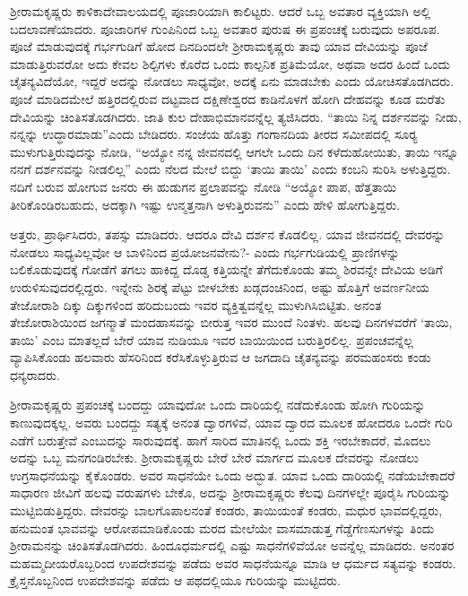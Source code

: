 ಶ‍್ರೀರಾಮಕೃಷ್ಣರು ಕಾಳಿಕಾದೇವಾಲಯದಲ್ಲಿ ಪೂಜಾರಿಯಾಗಿ ಕಾಲಿಟ್ಟರು. ಆದರೆ ಒಬ್ಬ ಅವತಾರ ವ್ಯಕ್ತಿಯಾಗಿ ಅಲ್ಲಿ ಬದಲಾವಣೆಯಾದರು. ಪೂಜಾರಿಗಳ ಗುಂಪಿನಿಂದ ಒಬ್ಬ ಅವತಾರ ಪುರುಷ ಈ ಪ್ರಪಂಚಕ್ಕೆ ಬರುವುದು ಅಪರೂಪ. ಪೂಜೆ ಮಾಡುವುದಕ್ಕೆ ಗರ್ಭಗುಡಿಗೆ ಹೋದ ದಿನದಿಂದಲೇ ಶ‍್ರೀರಾಮಕೃಷ್ಣರು ತಾವು ಯಾವ ದೇವಿಯನ್ನು ಪೂಜೆ ಮಾಡುತ್ತಿರುವರೋ ಅದು ಕೇವಲ ಶಿಲ್ಪಿಗಳು ಕೊರೆದ ಒಂದು ಕಾಲ್ಪನಿಕ ಪ್ರತಿಮೆಯೋ, ಅಥವಾ ಅದರ ಹಿಂದೆ ಒಂದು ಚೈತನ್ಯವಿದೆಯೋ, ಇದ್ದರೆ ಅದನ್ನು ನೋಡಲು ಸಾಧ್ಯವೋ, ಅದಕ್ಕೆ ಏನು ಮಾಡಬೇಕು ಎಂದು ಯೋಚಿಸತೊಡಗಿದರು. ಪೂಜೆ ಮಾಡಿದಮೇಲೆ ಹತ್ತಿರದಲ್ಲಿರುವ ದಟ್ಟವಾದ ದಕ್ಷಿಣೇಶ್ವರದ ಕಾಡಿನೊಳಗೆ ಹೋಗಿ ದೇಹವನ್ನು ಕೂಡ ಮರೆತು ದೇವಿಯನ್ನು ಚಿಂತಿಸತೊಡಗಿದರು. ಜಾತಿ ಕುಲ ದೇಹಾಭಿಮಾನವನ್ನೆಲ್ಲ ತ್ಯಜಿಸಿದರು. “ತಾಯಿ ನಿನ್ನ ದರ್ಶನವನ್ನು ನೀಡು, ನನ್ನನ್ನು ಉದ್ಧಾರಮಾಡು”ಎಂದು ಬೇಡಿದರು. ಸಂಜೆಯ ಹೊತ್ತು ಗಂಗಾನದಿಯ ತೀರದ ಸಮೀಪದಲ್ಲಿ ಸೂರ‍್ಯ ಮುಳುಗುತ್ತಿರುವುದನ್ನು ನೋಡಿ, “ಅಯ್ಯೋ ನನ್ನ ಜೀವನದಲ್ಲಿ ಆಗಲೇ ಒಂದು ದಿನ ಕಳೆದುಹೋಯಿತು, ತಾಯಿ ಇನ್ನೂ ನನಗೆ ದರ್ಶನವನ್ನು ನೀಡಲಿಲ್ಲ” ಎಂದು ನೆಲದ ಮೇಲೆ ಬಿದ್ದು ‘ತಾಯಿ ತಾಯಿ’ ಎಂದು ಕಂಬನಿ ಸುರಿಸಿ ಅಳುತ್ತಿದ್ದರು. ನದಿಗೆ ಬರುವ ಹೋಗುವ ಜನರು ಈ ಹುಡುಗನ ಪ್ರಲಾಪವನ್ನು ನೋಡಿ “ಅಯ್ಯೋ ಪಾಪ, ಹೆತ್ತತಾಯಿ ತೀರಿಕೊಂಡಿರಬಹುದು, ಅದಕ್ಕಾಗಿ ಇಷ್ಟು ಉನ್ಮತ್ತನಾಗಿ ಅಳುತ್ತಿರುವನು” ಎಂದು ಹೇಳಿ ಹೋಗುತ್ತಿದ್ದರು.

ಅತ್ತರು, ಪ್ರಾರ್ಥಿಸಿದರು, ತಪಸ್ಸು ಮಾಡಿದರು. ಆದರೂ ದೇವಿ ದರ್ಶನ ಕೊಡಲಿಲ್ಲ. ಯಾವ ಜೀವನದಲ್ಲಿ ದೇವರನ್ನು ನೋಡಲು ಸಾಧ್ಯವಿಲ್ಲವೋ ಆ ಬಾಳಿನಿಂದ ಪ್ರಯೋಜನವೇನು?- ಎಂದು ಗರ್ಭಗುಡಿಯಲ್ಲಿ ಪ್ರಾಣಿಗಳನ್ನು ಬಲಿಕೊಡುವುದಕ್ಕೆ ಗೋಡೆಗೆ ತಗಲು ಹಾಕಿದ್ದ ದೊಡ್ಡ ಕತ್ತಿಯನ್ನೇ ತೆಗೆದುಕೊಂಡು ತಮ್ಮ ಶಿರವನ್ನೇ ದೇವಿಯ ಅಡಿಗೆ ಉರುಳಿಸುವುದರಲ್ಲಿದ್ದರು. ಇನ್ನೇನು ಶಿರಕ್ಕೆ ಪೆಟ್ಟು ಬೀಳಬೇಕು ಖಡ್ಗದಂಚಿನಿಂದ, ಅಷ್ಟು ಹೊತ್ತಿಗೆ ಅವರ್ಣನೀಯ ತೇಜೋರಾಶಿ ದಿಕ್ಕು ದಿಕ್ಕುಗಳಿಂದ ಹರಿದುಬಂದು ಇವರ ವ್ಯಕ್ತಿತ್ವವನ್ನೆಲ್ಲ ಮುಳುಗಿಸಿಬಿಟ್ಟಿತು. ಅನಂತ ತೇಜೋರಾಶಿಯಿಂದ ಜಗನ್ಮಾತೆ ಮಂದಹಾಸವನ್ನು ಬೀರುತ್ತ ಇವರ ಮುಂದೆ ನಿಂತಳು. ಹಲವು ದಿನಗಳವರೆಗೆ ‘ತಾಯಿ, ತಾಯಿ’ ಎಂಬ ಮಾತಲ್ಲದೆ ಬೇರೆ ಯಾವ ನುಡಿಯೂ ಇವರ ಬಾಯಿಯಿಂದ ಬರುತ್ತಿರಲಿಲ್ಲ. ಪ್ರಪಂಚವನ್ನೆಲ್ಲ ವ್ಯಾಪಿಸಿಕೊಂಡು ಹಲವಾರು ಹೆಸರಿನಿಂದ ಕರೆಸಿಕೊಳ್ಳುತ್ತಿರುವ ಆ ಜಗದಾದಿ ಚೈತನ್ಯವನ್ನು ಪರಮಹಂಸರು ಕಂಡು ಧನ್ಯರಾದರು.

ಶ‍್ರೀರಾಮಕೃಷ್ಣರು ಪ್ರಪಂಚಕ್ಕೆ ಬಂದದ್ದು ಯಾವುದೋ ಒಂದು ದಾರಿಯಲ್ಲಿ ನಡೆದುಕೊಂಡು ಹೋಗಿ ಗುರಿಯನ್ನು ಕಾಣುವುದಕ್ಕಲ್ಲ. ಅವರು ಬಂದದ್ದು ಸತ್ಯಕ್ಕೆ ಅನಂತ ದ್ವಾರಗಳಿವೆ, ಯಾವ ದ್ವಾರದ ಮೂಲಕ ಹೋದರೂ ಒಂದೇ ಗುರಿ ಎಡೆಗೆ ಬರುತ್ತೇವೆ ಎಂಬುದನ್ನು ಸಾರುವುದಕ್ಕೆ. ಹಾಗೆ ಸಾರಿದ ಮಾತಿನಲ್ಲಿ ಒಂದು ಶಕ್ತಿ ಇರಬೇಕಾದರೆ, ಮೊದಲು ಅದನ್ನು ಒಬ್ಬ ಮನಗಂಡಿರಬೇಕು. ಶ‍್ರೀರಾಮಕೃಷ್ಣರು ಬೇರೆ ಬೇರೆ ಮಾರ್ಗದ ಮೂಲಕ ದೇವರನ್ನು ನೋಡಲು ಉಗ್ರಸಾಧನೆಯನ್ನು ಕೈಕೊಂಡರು. ಅವರ ಸಾಧನೆಯೇ ಒಂದು ಅದ್ಭುತ. ಯಾವ ಒಂದು ದಾರಿಯಲ್ಲಿ ನಡೆಯಬೇಕಾದರೆ ಸಾಧಾರಣ ಜೀವಿಗೆ ಹಲವು ವರುಷಗಳು ಬೇಕೊ, ಅದನ್ನು ಶ‍್ರೀರಾಮಕೃಷ್ಣರು ಕೆಲವು ದಿನಗಳಲ್ಲೇ ಪೂರೈಸಿ ಗುರಿಯನ್ನು ಮುಟ್ಟಿಬಿಡುತ್ತಿದ್ದರು. ದೇವರನ್ನು ಬಾಲಗೊಪಾಲನಂತೆ ಕಂಡರು, ತಾಯಿಯಂತೆ ಕಂಡರು, ಮಧುರ ಭಾವದಲ್ಲಿದ್ದರು, ಹನುಮಂತ ಭಾವವನ್ನು ಆರೋಪಮಾಡಿಕೊಂಡು ಮರದ ಮೇಲೆಯೇ ವಾಸಮಾಡುತ್ತ ಗೆಡ್ಡೆಗೆಣಸುಗಳನ್ನು ತಿಂದು ಶ‍್ರೀರಾಮನನ್ನು ಚಿಂತಿಸತೊಡಗಿದರು. ಹಿಂದೂಧರ್ಮದಲ್ಲಿ ಎಷ್ಟು ಸಾಧನೆಗಳಿವೆಯೋ ಅವನ್ನೆಲ್ಲ ಮಾಡಿದರು. ಅನಂತರ ಮಹಮ್ಮದೀಯರೊಬ್ಬರಿಂದ ಉಪದೇಶವನ್ನು ಪಡೆದು ಅವರ ಸಾಧನೆಯನ್ನೂ ಮಾಡಿ ಆ ಧರ್ಮದ ಸತ್ಯವನ್ನು ಕಂಡರು. ಕ್ರೈಸ್ತನೊಬ್ಬನಿಂದ ಉಪದೇಶವನ್ನು ಪಡೆದು ಆ ಪಥದಲ್ಲಿಯೂ ಗುರಿಯನ್ನು ಮುಟ್ಟಿದರು.


